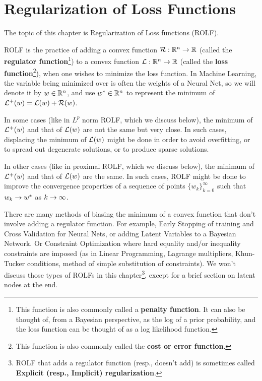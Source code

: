 \chapter{Regularization of Loss Functions}
\label{ch-regularization}


 The topic
 of this chapter is Regularization of Loss functions (ROLF).

ROLF is the practice of adding
a convex function  ${\cal R}:{ \mathbb{R}}^n\rightarrow { \mathbb{R}}$
(called the {\bf regulator function}\footnote{This function is also commonly called a {\bf penalty function}.
It can  also be thought  of, from a Bayesian perspective,
as the log of a prior probability, and the loss function can be thought of as a log likelihood function.}) to
a convex function  ${\cal L}:{ \mathbb{R}}^n\rightarrow { \mathbb{R}}$
(called the {\bf  loss function}\footnote{This function is also commonly
called the {\bf cost or error function}.}), when one
wishes to minimize the loss function. In Machine Learning,
the variable being minimized over is often the weights
of a Neural Net, so we will denote it by $w\in { \mathbb{R}}^n$, and use $w^*\in { \mathbb{R}}^n$
to represent the
minimum of ${\cal L}^+(w) ={\cal L}(w)+ {\cal R}(w)$.

In some cases (like in $L^p$ norm ROLF,
which we discuss below),
the minimum of ${\cal L}^+(w)$
and that of ${\cal L}(w)$
are not the same but very close. In such cases,
displacing the minimum of
${\cal L}(w)$
might be done in order
to avoid overfitting, or
to spread out degenerate solutions, or to produce
sparse solutions.

In other cases (like in proximal ROLF, which we discuss below),
the minimum of ${\cal L}^+(w)$
and that of ${\cal L}(w)$
are the  same.
In such cases, ROLF might be done
to improve the
convergence properties
of a sequence of points
$\{w_k\}_{k=0}^\infty$
such that $w_k\rightarrow w^*$
as $k
\rightarrow \infty$.

There are many methods
of biasing the
minimum of a convex function that  don't
involve adding a regulator
function.
For example, Early Stopping
of training
and Cross Validation for Neural Nets,
or adding Latent Variables
to a Bayesian Network.
Or Constraint Optimization where hard equality and/or inequality constraints are imposed (as in Linear Programming,
Lagrange multipliers, Khun-Tucker conditions, method of simple substitution of constraints).
We won't discuss those types of
ROLFs in this chapter\footnote{ROLF that adds a regulator function (resp., doesn't add)
is sometimes called {\bf Explicit (resp., Implicit)
regularization}.}, except for a brief section on latent nodes at the end.




